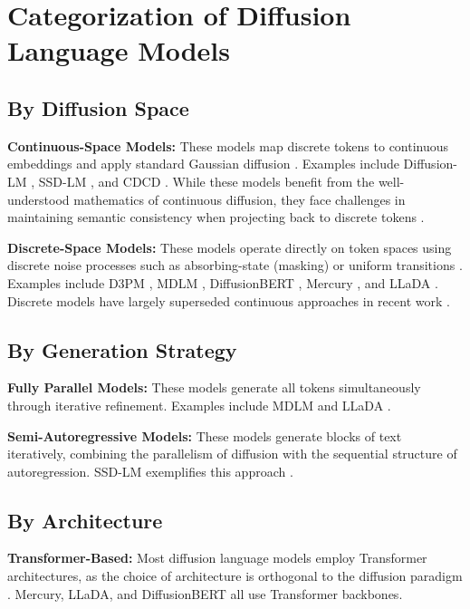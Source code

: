 \documentclass[11pt]{article}
\begin{document}
\section{Categorization of Diffusion Language Models}

\subsection{By Diffusion Space}

\textbf{Continuous-Space Models:} These models map discrete tokens to continuous embeddings and apply standard Gaussian diffusion \cite{shen2026codar}. Examples include Diffusion-LM \cite{li2022diffusion}, SSD-LM \cite{han2023ssdlm}, and CDCD \cite{dieleman2022cdcd}. While these models benefit from the well-understood mathematics of continuous diffusion, they face challenges in maintaining semantic consistency when projecting back to discrete tokens \cite{shen2026codar}.

\textbf{Discrete-Space Models:} These models operate directly on token spaces using discrete noise processes such as absorbing-state (masking) or uniform transitions \cite{jin2025discreteness}. Examples include D3PM \cite{austin2021d3pm}, MDLM \cite{sahoo2024simple}, DiffusionBERT \cite{wang2023diffusionbert}, Mercury \cite{khanna2025mercury}, and LLaDA \cite{nie2025large}. Discrete models have largely superseded continuous approaches in recent work \cite{jin2025discreteness}.

\subsection{By Generation Strategy}

\textbf{Fully Parallel Models:} These models generate all tokens simultaneously through iterative refinement. Examples include MDLM \cite{sahoo2024simple} and LLaDA \cite{nie2025large}.

\textbf{Semi-Autoregressive Models:} These models generate blocks of text iteratively, combining the parallelism of diffusion with the sequential structure of autoregression. SSD-LM exemplifies this approach \cite{han2023ssdlm}.

\subsection{By Architecture}

\textbf{Transformer-Based:} Most diffusion language models employ Transformer architectures, as the choice of architecture is orthogonal to the diffusion paradigm \cite{khanna2025mercury}. Mercury, LLaDA, and DiffusionBERT all use Transformer backbones.
\end{document}
